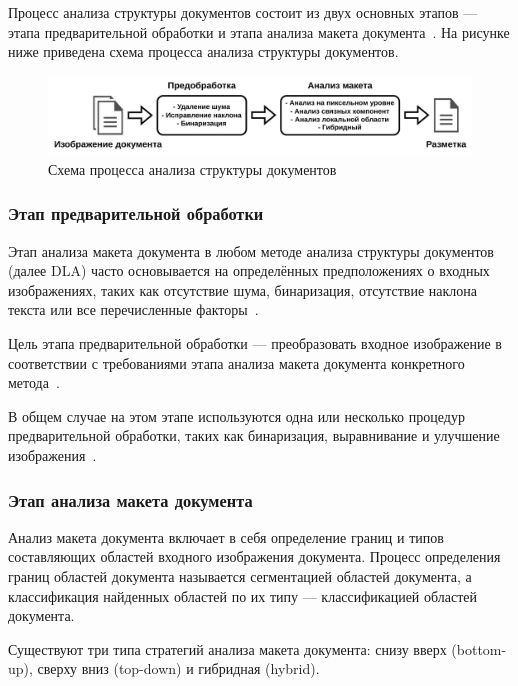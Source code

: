 Процесс анализа структуры документов состоит из двух основных этапов --- этапа предварительной обработки и этапа анализа макета документа~\cite{dla-survey, dla-book}.
На рисунке ниже приведена схема процесса анализа структуры документов.

\begin{figure}[H]
	\centering
	\includegraphics[width=\textwidth]{diag/dla.pdf}
	\caption{Схема процесса анализа структуры документов~\cite{dla-book}}
	\label{fig:}
\end{figure}

\subsubsection*{Этап предварительной обработки}

Этап анализа макета документа в любом методе анализа структуры документов (далее DLA) часто основывается на определённых предположениях о входных изображениях, таких как отсутствие шума, бинаризация, отсутствие наклона текста или все перечисленные факторы~\cite{dla-survey, dla-book}.

Цель этапа предварительной обработки --- преобразовать входное изображение в соответствии с требованиями этапа анализа макета документа конкретного метода~\cite{dla-survey, dla-book}.

В общем случае на этом этапе используются одна или несколько процедур предварительной обработки, таких как бинаризация, выравнивание и улучшение изображения~\cite{dla-survey, primer}.

\subsubsection*{Этап анализа макета документа}

Анализ макета документа включает в себя определение границ и типов составляющих областей входного изображения документа.
Процесс определения границ областей документа называется сегментацией областей документа, а классификация найденных областей по их типу --- классификацией областей документа.~\cite{dla-book}

Существуют три типа стратегий анализа макета документа: снизу вверх (bottom-up), сверху вниз (top-down) и гибридная (hybrid).

